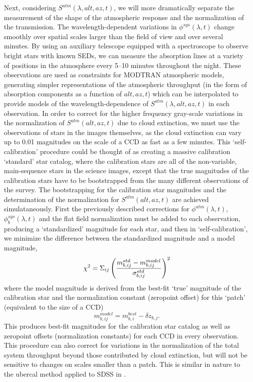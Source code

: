 \documentclass[12pt,preprint]{aastex}
\begin{document}
Next, considering $S^{atm}(\lambda,alt,az,t)$, we will more
dramatically separate the measurement of the shape of the atmospheric
response and the normalization of the transmission.  The
wavelength-dependent variations in $\phi^{sys}(\lambda,t)$ change
smoothly over spatial scales larger than the field of view and over
several minutes.  By using an auxiliary telescope equipped with a
spectroscope to observe bright stars with known SEDs, we can measure
the absorption lines at a variety of positions in the atmosphere every
5--10 minutes throughout the night. These observations are used as
constraints for MODTRAN atmospheric models, generating simpler
representations of the atmospheric throughput (in the form of
absorption components as a function of $alt,az,t$) which can be
interpolated to provide models of the wavelength-dependence of
$S^{atm}(\lambda,alt,az,t)$ in each observation. In order to correct
for the higher frequency gray-scale variations in the normalization of
$S^{atm}(alt,az,t)$ due to cloud extinction, we must use the
observations of stars in the images themselves, as the cloud
extinction can vary up to 0.01 magnitudes on the scale of a CCD
\citep{Ivezic2007} as fast as a few minutes. This `self-calibration'
procedure could be thought of as creating a massive calibration
`standard' star catalog, where the calibration stars are all of the
non-variable, main-sequence stars in the science images, except that
the true magnitudes of the calibration stars have to be bootstrapped
from the many different observations of the survey. The bootstrapping
for the calibration star magnitudes and the determination of the
normalization for $S^{atm}(alt,az,t)$ are achieved
simulataneously. First the previously described corrections for
$\phi^{atm}(\lambda,t)$, $\phi_b^{sys}(\lambda,t)$ and the flat field
normalization must be added to each observation, producing a
`standardized' magnitude for each star, and then in `self-calibration', we minimize the
difference between the standardized magnitude and a model magnitude,
\begin{equation}
\label{eqn:chi2}
\chi^2 = \Sigma_{ij} \left( { m_{b,ij}^{std} - m_{b,ij}^{model} \over \sigma_{b,ij}^{std} } \right)^2
\end{equation}
where the model magnitude is derived from the best-fit `true'
magnitude of the calibration star and the normalization constant
(zeropoint offset) for this `patch' (equivalent to the size of a CCD)
\begin{equation}
m_{b,ij}^{model} = m_{b,i}^{best} - \delta z_{b,j}.
\end{equation}
This produces best-fit magnitudes for the calibration star catalog as
well as zeropoint offsets (normalization constants) for each CCD in
every observation. This procedure can also correct for variations in
the normalization of the total system throughput beyond those
contributed by cloud extinction, but will not be sensitive to changes
on scales smaller than a patch.  This is similar in nature to the
ubercal method applied to SDSS in \citet{Padmanabhan2008}.
\end{document}

